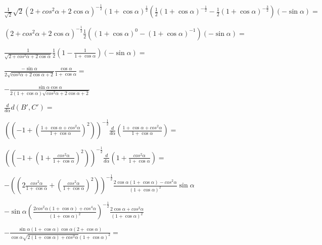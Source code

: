 \documentclass[a4paper,10pt]{article}
\begin{document}
$ \frac{1}{\sqrt{2}}\sqrt{2}\left(2 + cos^{2}{\alpha} + 2\cos{\alpha}\right)^{-\frac{1}{2}} \left(1 + \cos{\alpha}\right)^{\frac{1}{2}}
  \left(\frac{1}{2}\left(1 + \cos{\alpha}\right)^{-\frac{1}{2}} -\frac{1}{2}\left(1 + \cos{\alpha}\right)^{-\frac{3}{2}}\right)\left(-\sin{\alpha}\right) =$

$ \left(2 + cos^{2}{\alpha} + 2\cos{\alpha}\right)^{-\frac{1}{2}} 
  \frac{1}{2}\left(\left(1 + \cos{\alpha}\right)^{0} -\left(1 + \cos{\alpha}\right)^{-1}\right)\left(-\sin{\alpha}\right) =$

$ \frac{1}{\sqrt{  2 + cos^{2}{\alpha} + 2\cos{\alpha}  }}
  \frac{1}{2}\left(1 - \frac{1}{1 + \cos{\alpha}}\right)\left(-\sin{\alpha}\right) =$

$ \frac{-\sin{\alpha}}{2\sqrt{ cos^{2}{\alpha} + 2\cos{\alpha} + 2 }}
  \frac{\cos{\alpha}}{1 + \cos{\alpha}} =$

$ -\frac{\sin{\alpha}\cos{\alpha}}{2\left(1 + \cos{\alpha}\right)\sqrt{ cos^{2}{\alpha} + 2\cos{\alpha} + 2 }}$

\noindent$\frac{d}{d\alpha}d\left(B',C'\right)=$

$ \left(\left(-1 + \left( \frac{1 + \cos{\alpha} + cos^{2}{\alpha}}{1 + \cos{\alpha}}
                   \right ) ^{2}\right)\right)^{-\frac{1}{2}}
   \frac{d}{d\alpha} \left (\frac{1 + \cos{\alpha} + cos^{2}{\alpha}}{1 + \cos{\alpha}}
                           \right) =$



$ \left(\left(-1 + \left(1 +  \frac{cos^{2}{\alpha}}{1 + \cos{\alpha}}
                   \right ) ^{2}\right)\right)^{-\frac{1}{2}}
   \frac{d}{d\alpha} \left (1 + \frac{cos^{2}{\alpha}}{1 + \cos{\alpha}}
                           \right) =$


$ -\left(\left( 2\frac{cos^{2}{\alpha}}{1 + \cos{\alpha}} + \left(\frac{cos^{2}{\alpha}}{1 + \cos{\alpha}} \right ) ^{2}
        \right)
   \right)^{-\frac{1}{2}}
  \frac{2\cos{\alpha}\left(1+\cos{\alpha}\right) - cos^2{\alpha}}{\left(1 + \cos{\alpha}\right)^2}\sin{\alpha}$


$ -\sin{\alpha}\left(  
  \frac{ 2cos^{2}{\alpha}\left(1 + \cos{\alpha}\right) + cos^4{\alpha} }
       {\left(1 + \cos{\alpha}\right)^2}
   \right)^{-\frac{1}{2}}
  \frac{2\cos{\alpha} + cos^2{\alpha}}{\left(1 + \cos{\alpha}\right)^2}$

$ -\frac{\sin{\alpha}\left(1 + \cos{\alpha}\right)\cos{\alpha}\left(2  +\cos{\alpha}\right)}
   {\cos{\alpha}\sqrt{ 2\left(1 + \cos{\alpha}\right) + cos^2{\alpha} }\left(1 + \cos{\alpha}\right)^2}  =$
\end{document}
